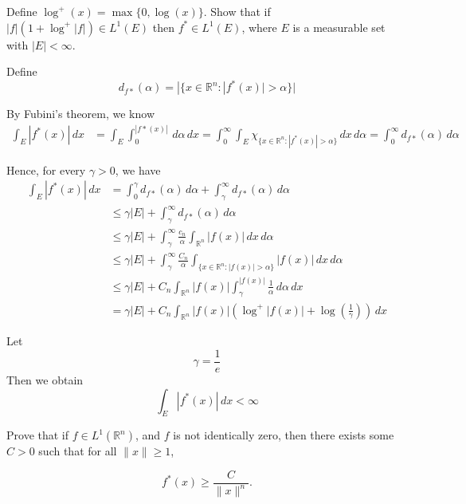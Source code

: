\documentclass[UTF8,a4paper,10pt]{article}
\begin{document}
\begin{Problem}[]{}
  Define $\log^+(x) = \max \{0, \log(x)\}$. Show that if $\left|f\right| \left(1 + \log^+\left|f\right|\right) \in L^1(E)$ then $f^* \in L^1(E)$, where $E$ is a measurable set with $\left|E\right| < \infty$.

\end{Problem}


Define
\[ d_{f*}(\alpha) = |\{x \in \mathbb{R}^n : |f^*(x)| > \alpha\} |\]

By Fubini's theorem, we know
\begin{align*}
    \int_{E} |f^*(x)| \, dx &= \int_{E} \int_0^{|f*(x)|} \, d\alpha \, dx = \int_0^\infty \int_{E} \chi_{\{x \in \mathbb{R}^n : |f^*(x)| > \alpha\}} \, dx \, d\alpha = \int_0^\infty d_{f*}(\alpha) \, d\alpha
\end{align*}

Hence, for every \( \gamma > 0 \), we have
\begin{align*}
    \int_{E} |f^*(x)| \, dx &= \int_0^\gamma d_{f*}(\alpha) \, d\alpha + \int_\gamma^\infty d_{f*}(\alpha) \, d\alpha \\
    &\leq \gamma |E| + \int_\gamma^\infty d_{f*}(\alpha) \, d\alpha \\
    &\leq \gamma |E| + \int_\gamma^\infty \frac{c_n}{\alpha}\int_{\mathbb{R}^n} |f(x)|\,dx\, d\alpha \\
    &\leq \gamma |E| + \int_\gamma^\infty \frac{C_n}{\alpha} \int_{\{x \in \mathbb{R}^n : |f(x)| > \alpha\}} |f(x)| \, dx \, d\alpha \\
    &\leq \gamma |E| + C_n \int_{\mathbb{R}^n} |f(x)| \int_\gamma^{|f(x)|}\frac{1}{\alpha} \, d\alpha \, dx \\
    &= \gamma |E| + C_n \int_{\mathbb{R}^n} |f(x)| \left( \log^+ |f(x)| + \log \left( \frac{1}{\gamma} \right) \right) \, dx
\end{align*}

Let
\[ \gamma = \frac{1}{e} \]
Then we obtain
\[ \int_{E} |f^*(x)| \, dx < \infty \]


\pagebreak

\begin{Problem}[]{}
  Prove that if $f \in L^1(\mathbb{R}^n)$, and $f$ is not identically zero, then there exists some $C > 0$ such that for all $\|x\| \geq 1$,

  $$
  f^*(x) \geq \frac{C}{\|x\|^n}.
  $$
  

\end{Problem}
\end{document}
